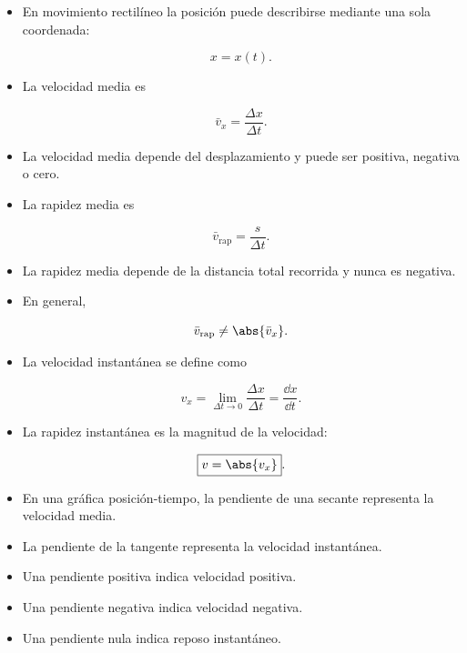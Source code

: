 \begin{resumen}

\begin{itemize}

    \item En movimiento rectilíneo la posición puede describirse mediante una
    sola coordenada:

    \[
    x=x(t).
    \]

    \item La velocidad media es

    \[
    \boxed{\bar{v}_x=\frac{\Delta x}{\Delta t}}.
    \]

    \item La velocidad media depende del desplazamiento y puede ser positiva,
    negativa o cero.

    \item La rapidez media es

    \[
    \boxed{\bar{v}_{\text{rap}}=\frac{s}{\Delta t}}.
    \]

    \item La rapidez media depende de la distancia total recorrida y nunca es
    negativa.

    \item En general,

    \[
    \bar{v}_{\text{rap}}\neq\abs{\bar{v}_x}.
    \]

    \item La velocidad instantánea se define como

    \[
    \boxed{
    v_x
    =
    \lim_{\Delta t\to0}
    \frac{\Delta x}{\Delta t}
    =
    \frac{\dd x}{\dd t}
    }.
    \]

    \item La rapidez instantánea es la magnitud de la velocidad:

    \[
    \boxed{v=\abs{v_x}}.
    \]

    \item En una gráfica posición-tiempo, la pendiente de una secante
    representa la velocidad media.

    \item La pendiente de la tangente representa la velocidad instantánea.

    \item Una pendiente positiva indica velocidad positiva.

    \item Una pendiente negativa indica velocidad negativa.

    \item Una pendiente nula indica reposo instantáneo.


\end{itemize}
\end{resumen}

